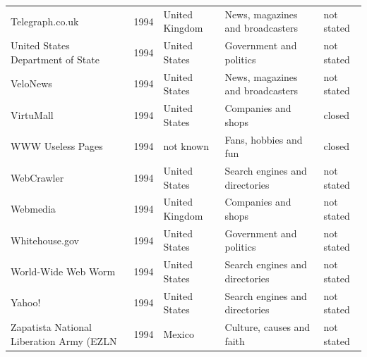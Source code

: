 \documentclass[11pt,a4paper]{article}
\begin{document}
\begin{footnotesize}
\begin{longtable}{p{4.6cm}rp{2.8cm}p{4.3cm}l}
Telegraph.co.uk & 1994 & United Kingdom & News, magazines and broadcasters & not stated\\
United States Department of State & 1994 & United States & Government and politics & not stated\\
VeloNews & 1994 & United States & News, magazines and broadcasters & not stated\\
VirtuMall & 1994 & United States & Companies and shops & closed\\
WWW Useless Pages & 1994 & not known & Fans, hobbies and fun & closed\\
WebCrawler & 1994 & United States & Search engines and directories & not stated\\
Webmedia & 1994 & United Kingdom & Companies and shops & not stated\\
Whitehouse.gov & 1994 & United States & Government and politics & not stated\\
World-Wide Web Worm & 1994 & United States & Search engines and directories & not stated\\
Yahoo! & 1994 & United States & Search engines and directories & not stated\\
Zapatista National Liberation Army (EZLN & 1994 & Mexico & Culture, causes and faith & not stated\\
\bottomrule\end{longtable}\end{footnotesize}
\end{document}
